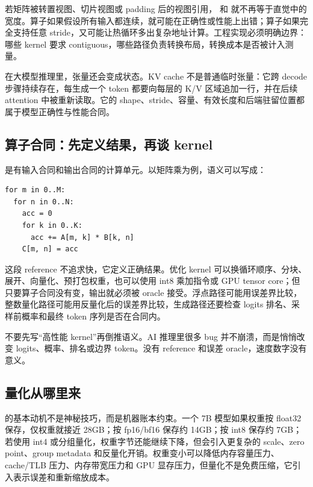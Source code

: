 若矩阵被转置视图、切片视图或 padding 后的视图引用， 和  就不再等于直觉中的宽度。算子如果假设所有输入都连续，就可能在正确性或性能上出错；算子如果完全支持任意 stride，又可能让热循环多出复杂地址计算。工程实现必须明确边界：哪些 kernel 要求 contiguous，哪些路径负责转换布局，转换成本是否被计入测量。

在大模型推理里，张量还会变成状态。KV cache 不是普通临时张量：它跨 decode 步骤持续存在，每生成一个 token 都要向每层的 K/V 区域追加一行，并在后续 attention 中被重新读取。它的 shape、stride、容量、有效长度和后端驻留位置都属于模型正确性与性能合同。

\subsection{算子合同：先定义结果，再谈 kernel}

 是有输入合同和输出合同的计算单元。以矩阵乘为例，语义可以写成：

\begin{lstlisting}[numbers=none,caption={矩阵乘 reference 语义}]
for m in 0..M:
  for n in 0..N:
    acc = 0
    for k in 0..K:
      acc += A[m, k] * B[k, n]
    C[m, n] = acc
\end{lstlisting}

这段 reference 不追求快，它定义正确结果。优化 kernel 可以换循环顺序、分块、展开、向量化、预打包权重，也可以使用 int8 乘加指令或 GPU tensor core；但只要算子合同没有变，输出就必须被 oracle 接受。浮点路径可能用误差界比较，整数量化路径可能用反量化后的误差界比较，生成路径还要检查 logits 排名、采样前概率和最终 token 序列是否在合同内。

\begin{warningbox}
不要先写“高性能 kernel”再倒推语义。AI 推理里很多 bug 并不崩溃，而是悄悄改变 logits、概率、排名或边界 token。没有 reference 和误差 oracle，速度数字没有意义。
\end{warningbox}

\subsection{量化从哪里来}

 的基本动机不是神秘技巧，而是机器账本约束。一个 7B 模型如果权重按 float32 保存，仅权重就接近 28GB；按 fp16/bf16 保存约 14GB；按 int8 保存约 7GB；若使用 int4 或分组量化，权重字节还能继续下降，但会引入更复杂的 scale、zero point、group metadata 和反量化开销。权重变小可以降低内存容量压力、cache/TLB 压力、内存带宽压力和 GPU 显存压力，但量化不是免费压缩，它引入表示误差和重新缩放成本。

